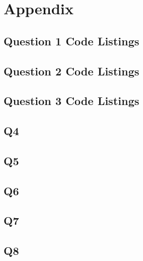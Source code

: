 \newpage
\renewcommand{\thesubsection}{\thesection.\arabic{subsection}}
\section{Appendix}
	\subsection{Question 1 Code Listings}
	
	
	\pagebreak
	\subsection{Question 2 Code Listings}
	
	
	\pagebreak
	\subsection{Question 3 Code Listings}
	
	
	\pagebreak
	\subsection{Q4}
	
	\pagebreak
	\subsection{Q5}
	
	\pagebreak
	\subsection{Q6}
	
	\pagebreak
	\subsection{Q7}
	
	\pagebreak
	\subsection{Q8}
	